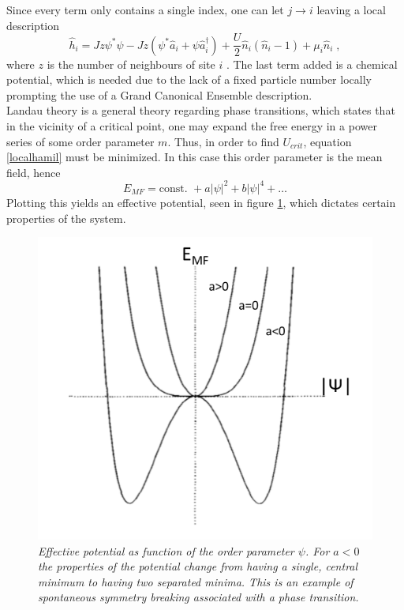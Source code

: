 Since every term only contains a single index, one can let $j \rightarrow i$ leaving a local description
\begin{equation}
	\hat{h}_i = J z \psi^* \psi - J z \left( \psi^* \hat{a}_i + \psi \hat{a}_{i}^{\dag} \right) + \frac{U}{2} \hat{n}_i \left( \hat{n}_i -1 \right) + \mu_i \hat{n}_i \; ,
	\label{localhamil}
\end{equation}
where $z$ is the number of neighbours of site $i$ \cite{vanoosten}. The last term added is a chemical potential, which is needed due to the lack of a fixed particle number locally prompting the use of a Grand Canonical Ensemble description.\\
Landau theory is a general theory regarding phase transitions, which states that in the vicinity of a critical point, one may expand the free energy in a power series of some order parameter $m$. Thus, in order to find $U_{crit}$, equation \eqref{localhamil} must be minimized. In this case this order parameter is the mean field, hence
\begin{equation}
	E_{MF} = \text{const. } + a |\psi|^2 + b |\psi|^4 + \ldots \label{eq:landau}
\end{equation} 
Plotting this yields an effective potential, seen in figure \ref{fig:landau}, which dictates certain properties of the system.
\begin{figure}[!h]
\centering
\includegraphics[width=0.7\columnwidth]{Figures/Landau_theory.pdf} 
\caption{	\textit{Effective potential as function of the order parameter $\psi$. For $a<0$ the properties of the potential change from having a single, central minimum to having two separated minima. This is an example of spontaneous symmetry breaking associated with a phase transition. \cite{plischke}}}
\label{fig:landau} 
\end{figure} 

